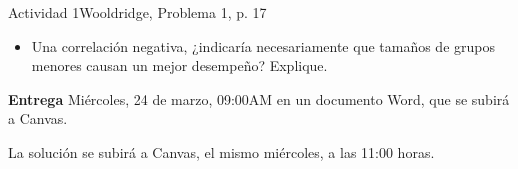 \documentclass[11pt,handout]{beamer}
\begin{document}
\begin{frame}{Actividad 1}{Wooldridge, Problema 1, p. 17}

\begin{itemize}		
		\item Una correlación negativa, ¿indicaría necesariamente que tamaños de grupos menores causan un mejor desempeño? Explique.
\end{itemize}

\vspace{.25cm}

\textbf{Entrega} Miércoles, 24 de marzo, 09:00AM en un documento Word, que se subirá a Canvas.  

La solución se subirá a Canvas, el mismo miércoles, a las 11:00 horas. 
\end{frame}
\end{document}
